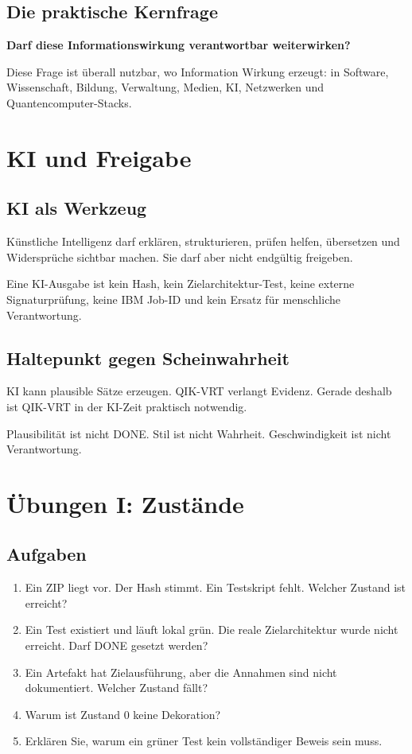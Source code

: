 \documentclass[11pt,a4paper,oneside]{book}
\begin{document}
\section{Die praktische Kernfrage}

\begin{merkbox}
\centering
\textbf{Darf diese Informationswirkung verantwortbar weiterwirken?}
\end{merkbox}

Diese Frage ist überall nutzbar, wo Information Wirkung erzeugt: in Software, Wissenschaft, Bildung, Verwaltung, Medien, KI, Netzwerken und Quantencomputer-Stacks.

\chapter{KI und Freigabe}

\section{KI als Werkzeug}

Künstliche Intelligenz darf erklären, strukturieren, prüfen helfen, übersetzen und Widersprüche sichtbar machen. Sie darf aber nicht endgültig freigeben.

Eine KI-Ausgabe ist kein Hash, kein Zielarchitektur-Test, keine externe Signaturprüfung, keine IBM Job-ID und kein Ersatz für menschliche Verantwortung.

\section{Haltepunkt gegen Scheinwahrheit}

KI kann plausible Sätze erzeugen. QIK-VRT verlangt Evidenz. Gerade deshalb ist QIK-VRT in der KI-Zeit praktisch notwendig.

Plausibilität ist nicht DONE. Stil ist nicht Wahrheit. Geschwindigkeit ist nicht Verantwortung.

\chapter{Übungen I: Zustände}

\section{Aufgaben}

\begin{enumerate}
\item Ein ZIP liegt vor. Der Hash stimmt. Ein Testskript fehlt. Welcher Zustand ist erreicht?
\item Ein Test existiert und läuft lokal grün. Die reale Zielarchitektur wurde nicht erreicht. Darf DONE gesetzt werden?
\item Ein Artefakt hat Zielausführung, aber die Annahmen sind nicht dokumentiert. Welcher Zustand fällt?
\item Warum ist Zustand 0 keine Dekoration?
\item Erklären Sie, warum ein grüner Test kein vollständiger Beweis sein muss.
\end{enumerate}
\end{document}
